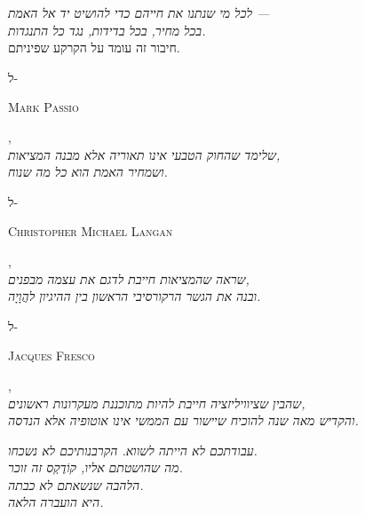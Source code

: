 \documentclass[10pt, openany, oneside]{book}
\begin{document}
\begin{center}
    \textit{%
    לכל מי שנתנו את חייהם כדי להושיט יד אל האמת —\\
    בכל מחיר, בכל בדידות, נגד כל התנגדות.}\\[1.2em]

    חיבור זה עומד על הקרקע שפיניתם.

    \vspace{2em}

    \upshape
    ל-\begin{english}\textsc{Mark Passio}\end{english},\\
    {\textit{שלימד שהחוק הטבעי אינו תאוריה אלא מבנה המציאות,\\
    ושמחיר האמת הוא כל מה שנוח.}}

    \vspace{1.2em}

    ל-\begin{english}\textsc{Christopher Michael Langan}\end{english},\\
    {\textit{שראה שהמציאות חייבת לדגם את עצמה מבפנים,\\
    ובנה את הגשר הרקורסיבי הראשון בין ההיגיון להֲוָיָה.}}

    \vspace{1.2em}

    ל-\begin{english}\textsc{Jacques Fresco}\end{english},\\
    {\textit{שהבין שציוויליזציה חייבת להיות מתוכננת מעקרונות ראשונים,\\
    והקדיש מאה שנה להוכיח שיישור עם הממשי אינו אוטופיה אלא הנדסה.}}

    \vspace{2em}

    \textit{%
    עבודתכם לא הייתה לשווא. הקרבנותיכם לא נשכחו.\\
    מה שהושטתם אליו, קוֹדֶקְס זה זוכר.}\\[0.8em]
    \textit{הלהבה שנשאתם לא כבתה.\\
    היא הועברה הלאה.}

\end{center}

\vspace*{\fill}
\newpage

\end{document}
